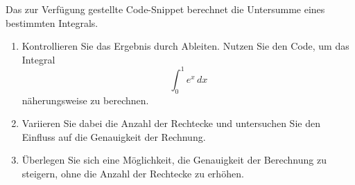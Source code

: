 \begin{ExerciseBlock}
Das zur Verfügung gestellte Code-Snippet berechnet die Untersumme eines bestimmten Integrals. \par

\begin{enumerate}[label=\alph*)]
	
	\item Kontrollieren Sie das Ergebnis durch Ableiten.
Nutzen Sie den Code, um das Integral \[ \int_0^1 e^x \, dx \] näherungsweise zu berechnen.
	
	\item Variieren Sie dabei die Anzahl der Rechtecke und untersuchen Sie den Einfluss auf die Genauigkeit der Rechnung.
	
	\item Überlegen Sie sich eine Möglichkeit, die Genauigkeit der Berechnung zu steigern, ohne die Anzahl der Rechtecke zu erhöhen.
	
\end{enumerate}
\end{ExerciseBlock}
